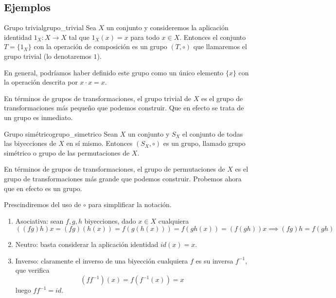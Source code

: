 \subsection{Ejemplos}

\begin{example}{Grupo trivial}{grupo_trivial}
    Sea \(X\) un conjunto y consideremos la aplicación identidad $1_X: X \to X$ tal que $1_X(x) = x$ para todo $x \in X$. Entonces el conjunto $T = \{1_X\}$ con la operación de composición es un grupo $(T, \circ)$ que llamaremos el grupo trivial (lo denotaremos $1$).
    
    En general, podríamos haber definido este grupo como un único elemento $\{x\}$ con la operación descrita por $x \cdot x = x$.
\end{example}

En términos de grupos de transformaciones, el grupo trivial de $X$ es el grupo de transformaciones más pequeño que podemos construir. Que en efecto se trata de un grupo es inmediato.

\begin{example}{Grupo simétrico}{grupo_simetrico}
    Sean \(X\) un conjunto y \(S_X\) el conjunto de todas las biyecciones de \(X\) en sí mismo. Entonces \((S_X, \circ)\) es un grupo, llamado {grupo simétrico} o {grupo de las permutaciones} de \(X\).
\end{example}

En términos de grupos de transformaciones, el grupo de permutaciones de $X$ es el grupo de transformaciones más grande que podemos construir. Probemos ahora que en efecto es un grupo.

\begin{proofbox}
    Prescindiremos del uso de $\circ$ para simplificar la notación.
    \begin{enumerate}
        \item Asociativa: sean $f,g,h$ biyecciones, dado $x \in X$ cualquiera
        \[
            ((fg)h) x = (fg)(h(x)) = f(g(h(x))) = f(gh(x)) = (f(gh))x \implies (fg)h = f(gh)
        \]
        \item Neutro: basta considerar la aplicación identidad $id(x) = x$.
        \item Inverso: claramente el inverso de una biyección cualquiera $f$ es su inversa $f^{-1}$, que verifica
        \[
        (f f^{-1})(x) = f(f^{-1}(x)) = x
        \]
        luego $ff^{-1} = id$.
    \end{enumerate}
\end{proofbox}

